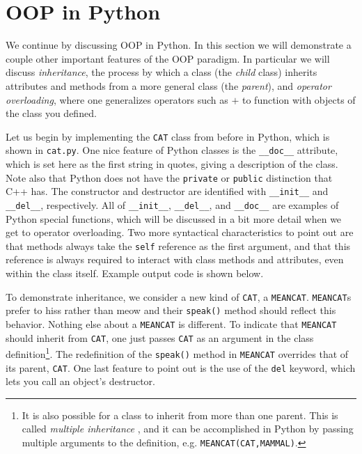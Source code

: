 \section{OOP in Python}

We continue by discussing OOP in Python. In this section we will demonstrate
a couple other important features of the OOP paradigm. In particular we will
discuss {\it inheritance}, the process by which a
class (the {\it child} class) inherits attributes and methods
from a more general class (the {\it parent}), and
{\it operator overloading},  where one generalizes 
operators such as $+$ to function with objects of the class you defined.



Let us begin by implementing the \texttt{CAT} class from before in Python,
which is shown in \texttt{cat.py}. One nice feature of Python classes
is the \texttt{\_\_doc\_\_} attribute, which is set here as the first string
in quotes, giving a description of the class. Note also that Python
does not have the \texttt{private} or \texttt{public} distinction that
C++ has. The constructor and destructor are identified with
\texttt{\_\_init\_\_} and \texttt{\_\_del\_\_}, respectively. All of
\texttt{\_\_init\_\_}, \texttt{\_\_del\_\_}, and \texttt{\_\_doc\_\_} 
are examples of
Python special functions, which will be discussed in a bit more detail
when we get to operator overloading. Two more syntactical characteristics 
to point out are that methods always take the \texttt{self} reference as 
the first argument, and that this reference is always required to
interact with class methods and attributes, even within the class itself.
Example output code is shown below.




To demonstrate inheritance, we consider a new kind of \texttt{CAT}, a
\texttt{MEANCAT}. \texttt{MEANCAT}s prefer to hiss rather than meow and
their \texttt{speak()} method should reflect this behavior. Nothing else
about a \texttt{MEANCAT} is different. To indicate that \texttt{MEANCAT}
should inherit from \texttt{CAT}, one just passes \texttt{CAT} as an argument
in the class definition\footnote{It is also possible for a class to inherit
from more than one parent. This is called {\it multiple inheritance}
, and it can be accomplished in Python by passing
multiple arguments to the definition, e.g. \texttt{MEANCAT(CAT,MAMMAL)}.}. 
The redefinition of the \texttt{speak()} method
in \texttt{MEANCAT} overrides that of its parent, \texttt{CAT}. One last
feature to point out is the use of the \texttt{del} keyword, which lets you
call an object's destructor.








